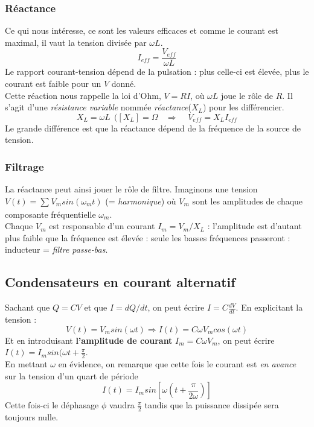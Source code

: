 \documentclass	[11pt, a4paper, openany]{book}
\begin{document}
	\subsubsection{Réactance}
	Ce qui nous intéresse, ce sont les valeurs efficaces et comme le courant est maximal, il vaut la tension divisée par $\omega L$.
	\begin{equation}
		I_{eff} = \frac{V_{eff}}{\omega L}
	\end{equation}
	Le rapport courant-tension dépend de la pulsation : plus celle-ci est élevée, plus le courant est faible pour un $V$ donné.\\
	Cette réaction nous rappelle la loi d'Ohm, $V = RI$, où $\omega L$ joue le rôle de $R$. Il s'agit d'une \textit{résistance variable} nommée \textit{réactance}($X_L$) pour les différencier.
	\begin{equation}
		X_L = \omega L\ \ ([X_L] = \Omega\ \ \ \ \Rightarrow\ \ \ \ \ V_{eff} = X_LI_{eff}
	\end{equation}
	Le grande différence est que la réactance dépend de la fréquence de la source de tension.
	
	\subsubsection{Filtrage}
	La réactance peut ainsi jouer le rôle de filtre. Imaginons une tension $V(t) = \sum_{}^{} V_m sin(\omega_m t)$ (= \textit{harmonique}) où $V_m$ sont les amplitudes de chaque composante fréquentielle $\omega_m$.\\
	
	Chaque $V_m$ est responsable d'un courant $I_m = V_m / X_L$ : l'amplitude est d'autant plus faible que la fréquence est élevée : seule les basses fréquences passeront : inducteur = \textit{filtre passe-bas}.
	
	\subsection{Condensateurs en courant alternatif}
	Sachant que $Q = CV$ et que $I = dQ/dt$, on peut écrire $I = C \frac{dV}{dt}$. En explicitant la tension : 
	\begin{equation}
		V(t) = V_m sin(\omega t) \Rightarrow I(t) = C\omega V_m cos(\omega t)
	\end{equation}
	Et en introduisant \textbf{l'amplitude de courant} $I_m = C\omega V_m$, on peut écrire $I(t) = I_m sin(\omega t + \frac{\pi}{2}$.\\
	En mettant $\omega$ en évidence, on remarque que cette fois le courant est \textit{en avance} sur la tension d'un quart de période
	\begin{equation}
		I(t) = I_m sin\left[\omega (t + \frac{\pi}{2\omega})\right]
	\end{equation}
	Cette fois-ci le déphasage $\phi$ vaudra $\frac{\pi}{2}$ tandis que la puissance dissipée sera toujours nulle.
\end{document}
